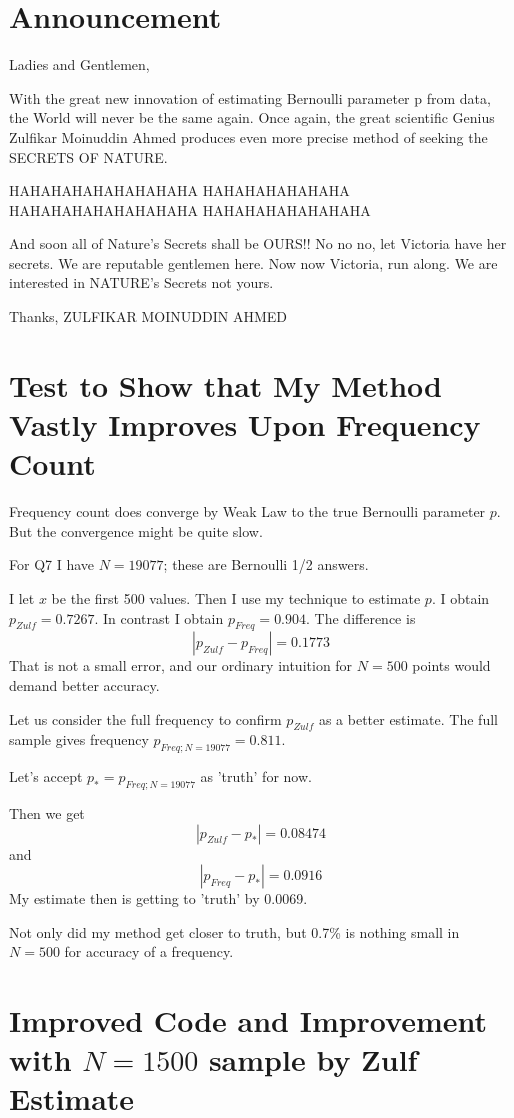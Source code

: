 \documentclass{amsart}
\begin{document}
\section{Announcement}

Ladies and Gentlemen,

With the great new innovation of estimating Bernoulli parameter p from data, the World will never be the same again.  Once again, the great scientific Genius Zulfikar Moinuddin Ahmed produces even more precise method of seeking the SECRETS OF NATURE.

HAHAHAHAHAHAHAHAHA
HAHAHAHAHAHAHA
HAHAHAHAHAHAHAHAHA
HAHAHAHAHAHAHAHA

And soon all of Nature's Secrets shall be OURS!!  No no no, let Victoria have her secrets.  We are reputable gentlemen here.  Now now Victoria, run along.  We are interested in NATURE's Secrets not yours.

Thanks,
ZULFIKAR MOINUDDIN AHMED


\section{Test to Show that My Method Vastly Improves Upon Frequency Count}

Frequency count does converge by Weak Law to the true Bernoulli parameter $p$.  But the convergence might be quite slow.

For Q7 I have $N=19077$; these are Bernoulli 1/2 answers.

I let $x$ be the first 500 values.  Then I use my technique to estimate $p$.  I obtain $p_{Zulf}=0.7267$.  In contrast I obtain $p_{Freq} = 0.904$.  The difference is 
\[
|p_{Zulf} - p_{Freq}| = 0.1773
\]
That is not a small error, and our ordinary intuition for $N=500$ points would demand better accuracy.

Let us consider the full frequency to confirm $p_{Zulf}$ as a better estimate.  The full sample gives frequency $p_{Freq;N=19077}=0.811$.

Let's accept $p_* = p_{Freq;N=19077}$ as 'truth' for now.

Then we get
\[
|p_{Zulf} - p_*| = 0.08474
\]
and
\[
|p_{Freq} - p_*| = 0.0916
\]
My estimate then is getting to 'truth' by 0.0069.

Not only did my method get closer to truth, but 0.7\% is nothing small in $N=500$ for accuracy of a frequency.

\section{Improved Code and Improvement with $N=1500$ sample by Zulf Estimate}
\end{document}
